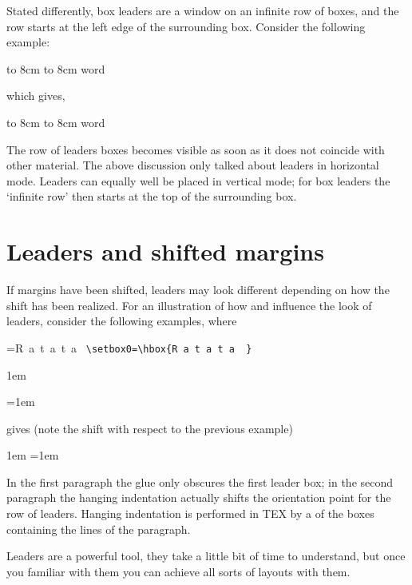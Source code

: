 Stated differently, box leaders are a window on an infinite row of boxes, and the row starts at the
left edge of the surrounding box. Consider the following example:

\begin{texexample}{}{}
\hbox to 8cm {\leaders\copy\centerdot\hfil}
\hbox to 8cm {word\leaders\copy\centerdot\hfil}
\end{texexample}

which gives,

\hbox to 8cm {\leaders\copy\centerdot\hfil}
\hbox to 8cm {word\leaders\copy\centerdot\hfil}

The row of leaders boxes becomes visible as soon as it does not coincide with other material.
The above discussion only talked about leaders in horizontal mode. Leaders can equally well be
placed in vertical mode; for box leaders the ‘infinite row’ then starts at the top of the surrounding
box.


\section{Leaders and shifted margins}

If margins have been shifted, leaders may look different depending on how the shift has been realized.
For an illustration of how and influence the look of leaders, consider
the following examples, where

=\hbox{R a t a t a  }
\verb+\setbox0=\hbox{R a t a t a  }+



\hbox{\kern1em\hbox{\leaders{}\hskip5cm}}

\hangindent=1em  \noindent
\leaders{}\hskip5cm\hbox{}\par


gives (note the shift with respect to the previous example)
\medskip

{\hbox{\kern1em\hbox{\leaders{}\hskip5cm}}
\hangindent=1em  \noindent
\leaders{}\hskip5cm\hbox{}\par}

In the first paragraph the glue only obscures the first leader box; in the second paragraph
the hanging indentation actually shifts the orientation point for the row of leaders. Hanging
indentation is performed in TEX by a of the boxes containing the lines of the
paragraph.

   

Leaders are a powerful tool, they take a little bit of time to understand, but once you familiar with them you can achieve all sorts of layouts with them.






